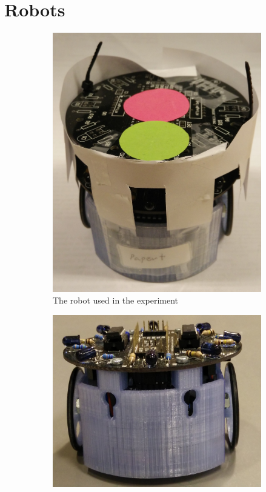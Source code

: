 \section{Robots}
\label{sec:robot}
\begin{figure}[H]
    \centering
    \begin{subfigure}[b]{0.3\textwidth}
        \centering
        \includegraphics[width=\textwidth]{figs/robot1}
        \caption{The robot used in the experiment}
        \label{fig:robot0}
    \end{subfigure}
    \hfill
    \begin{subfigure}[b]{0.3\textwidth}
        \centering
        \includegraphics[width=\textwidth]{figs/robot2}

\end{subfigure}
\end{figure}
